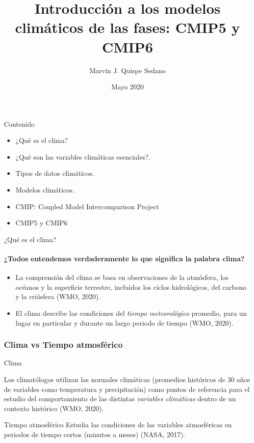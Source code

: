 \documentclass{beamer}
\title[]{Introducción a los modelos climáticos de las fases: CMIP5 y CMIP6}
\author{Marvin J. Quispe Sedano}
\date{Mayo 2020}
\begin{document}
\maketitle
\begin{frame}{Contenido}
\begin{itemize}
\item ¿Qué es el clima? 
\item ¿Qué son las variables climáticas esenciales?.
\item Tipos de datos climáticos. 
\item Modelos climáticos.
\item CMIP: Coupled Model Intercomparison Project
\item CMIP5 y CMIP6
\end{itemize}
\end{frame}

\begin{frame}{¿Qué es el clima?}
\framesubtitle{¿Todos entendemos verdaderamente lo que significa la palabra clima?}

\begin{itemize}
	\setlength\itemsep{1em}      
    \item La comprensión del clima se basa en observaciones de la atmósfera, los océanos y la superficie terrestre, incluidos los ciclos hidrológicos, del carbono y la criósfera (WMO, 2020).
    \item El clima describe las condiciones del \emph{tiempo meteorológico} promedio, para un lugar en particular y durante un largo periodo de tiempo (WMO, 2020). 
 
\end{itemize}
\end{frame}

\begin{frame}
\frametitle{Clima vs Tiempo atmosférico}
 
\begin{block}{Clima}

Los climatólogos utilizan las normales climáticas (promedios históricos de 30 años de variables como temperatura y precipitación) como puntos de referencia para el estudio del comportamiento de las distintas \emph{variables climáticas} dentro de un contexto histórico (WMO, 2020).

\end{block}
 
\begin{block}{Tiempo atmosférico}
Estudia las condiciones de las variables atmosféricas en periodos de tiempo cortos (minutos a meses) (NASA, 2017).

\end{block}
\end{frame}
\end{document}
